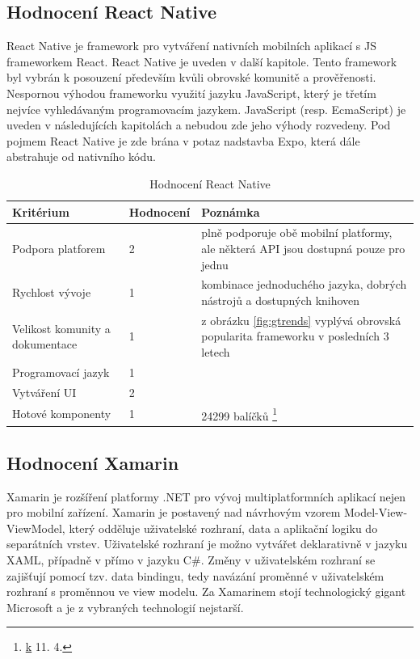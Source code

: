 \subsection{Hodnocení React Native}

React Native je framework pro vytváření nativních mobilních aplikací s JS frameworkem React. React Native je uveden v další kapitole. Tento framework byl vybrán k posouzení především kvůli obrovské komunitě a prověřenosti. Nespornou výhodou frameworku využití jazyku JavaScript, který je třetím nejvíce vyhledávaným programovacím jazykem. JavaScript (resp. EcmaScript) je uveden v následujících kapitolách a nebudou zde jeho výhody rozvedeny. Pod pojmem React Native je zde brána v potaz nadstavba Expo, která dále abstrahuje od nativního kódu.

\begin{table}[H]
	\begin{tabularx}{\textwidth}{| X | X | X |}
		\hline
		Kritérium                       & Hodnocení & Poznámka \\
		\hline
		Podpora platforem  & 2  & plně podporuje obě mobilní platformy, ale některá API jsou dostupná pouze pro jednu \\
		\hline
		Rychlost vývoje                 & 1 & kombinace jednoduchého jazyka, dobrých nástrojů a dostupných knihoven \\
		\hline
		Velikost komunity a dokumentace & 1  & z obrázku  \ref{fig:gtrends}  vyplývá obrovská popularita frameworku v posledních 3 letech \\
		\hline
		Programovací jazyk              & 1 &          \\
		\hline
		Vytváření UI                    & 2 &          \\
		\hline
		Hotové komponenty               & 1 & 24299 balíčků \footnote{\href{https://www.npmjs.com/search?q=react\%20native} k 11. 4.}   \\
		\hline
	\end{tabularx}
	\caption{Hodnocení React Native}
\end{table}

\subsection{Hodnocení Xamarin}


Xamarin je rozšíření platformy .NET pro vývoj multiplatformních aplikací nejen pro mobilní zařízení. Xamarin je postavený nad návrhovým vzorem Model-View-ViewModel, který odděluje uživatelské rozhraní, data a aplikační logiku do separátních vrstev. Uživatelské rozhraní je možno vytvářet deklarativně v jazyku XAML, případně v přímo v jazyku C\#. Změny v uživatelském rozhraní se zajišťují pomocí tzv. data bindingu, tedy navázání proměnné v uživatelském rozhraní s proměnnou ve view modelu. Za Xamarinem stojí technologický gigant Microsoft a je z vybraných technologií nejstarší.

